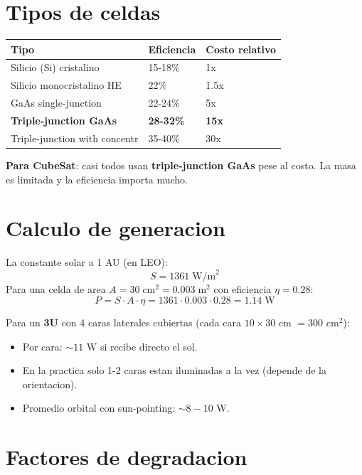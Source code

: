 \documentclass[11pt,a4paper,oneside,openright]{book}
\begin{document}
\section{Tipos de celdas}

\begin{center}
\begin{tabular}{lll}
\toprule
\textbf{Tipo} & \textbf{Eficiencia} & \textbf{Costo relativo} \\
\midrule
Silicio (Si) cristalino       & 15-18\%  & 1x \\
Silicio monocristalino HE     & 22\%     & 1.5x \\
GaAs single-junction           & 22-24\%  & 5x \\
\textbf{Triple-junction GaAs}  & \textbf{28-32\%} & \textbf{15x} \\
Triple-junction with concentr & 35-40\%  & 30x \\
\bottomrule
\end{tabular}
\end{center}

\textbf{Para CubeSat}: casi todos usan \textbf{triple-junction GaAs}
pese al costo. La masa es limitada y la eficiencia importa mucho.

\section{Calculo de generacion}

\begin{calculo}
La constante solar a 1 AU (en LEO):
\[
S = 1361\;\text{W/m}^2
\]
Para una celda de area $A = 30\;\text{cm}^2 = 0.003\;\text{m}^2$ con
eficiencia $\eta = 0.28$:
\[
P = S \cdot A \cdot \eta = 1361 \cdot 0.003 \cdot 0.28 = 1.14\;\text{W}
\]
\end{calculo}

Para un \textbf{3U} con 4 caras laterales cubiertas (cada cara
$10 \times 30$ cm $= 300$ cm$^2$):
\begin{itemize}[leftmargin=2em]
  \item Por cara: $\sim 11$ W si recibe directo el sol.
  \item En la practica solo 1-2 caras estan iluminadas a la vez (depende
        de la orientacion).
  \item Promedio orbital con sun-pointing: $\sim 8-10$ W.
\end{itemize}

\section{Factores de degradacion}
\end{document}

